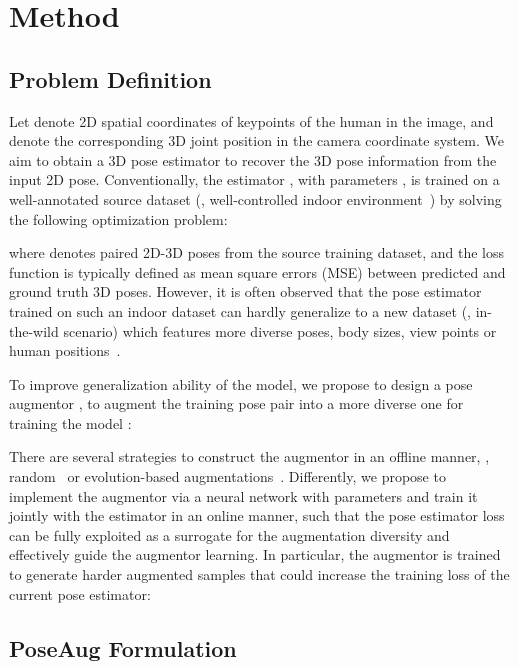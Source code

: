 \documentclass[final]{cvpr}
\begin{document}
 

\section{Method}


\subsection{Problem Definition}

Let  denote 2D spatial coordinates of  keypoints of the human in the image, and  denote the corresponding 3D joint position in the camera coordinate system.
We aim to obtain a 3D pose estimator  to recover the 3D pose information from the input 2D  pose. Conventionally, the estimator , with parameters , is trained on a well-annotated source dataset (\eg, well-controlled indoor environment~\cite{ionescu2014human3}) by solving the following optimization problem:

where  denotes paired 2D-3D poses from the source training dataset, and the loss function  is typically defined as mean square errors (MSE) between predicted and ground truth 3D poses.
However, it is often observed that the pose estimator  trained on such an indoor dataset can hardly generalize to a  new dataset (\eg, in-the-wild scenario) which features more diverse poses, body sizes, view points or human positions~\cite{inthewild3d_2019,zhang2020inference,wang2020predicting}.


To improve generalization ability of the model, we propose to design a pose augmentor , to augment the training pose pair  into a more diverse one  for  training the model :

There are several strategies to construct the augmentor in an offline manner, \eg, random~\cite{chen2016synthesizing,mehta2017vnect,varol2017learning} or evolution-based augmentations~\cite{Li_2020_CVPR}.
Differently, we propose to implement the augmentor  via a neural network with parameters  and train it jointly with the estimator in an online manner, such that the pose estimator loss can be fully exploited as a surrogate for the augmentation diversity and effectively guide the augmentor learning. In particular, the augmentor is trained to generate harder augmented samples that could increase the training loss of the current pose estimator: 




\subsection{PoseAug Formulation}
\end{document}
